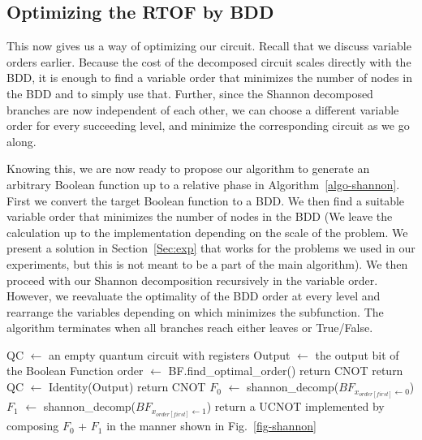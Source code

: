 \subsection{Optimizing the RTOF by BDD}
\label{Subsec:rtof-opt}
This now gives us a way of optimizing our circuit. Recall that we discuss variable orders earlier. Because the cost of the decomposed circuit scales directly with the BDD, it is enough to find a variable order that minimizes the number of nodes in the BDD and to simply use that. Further, since the Shannon decomposed branches are now independent of each other, we can choose a different variable order for every succeeding level, and minimize the corresponding circuit as we go along.

Knowing this, we are now ready to propose our algorithm to generate an arbitrary Boolean function up to a relative phase in Algorithm~\ref{algo-shannon}. First we convert the target Boolean function to a BDD. We then find a suitable variable order that minimizes the number of nodes in the BDD (We leave the calculation up to the implementation depending on the scale of the problem. We present a solution in Section~\ref{Sec:exp} that works for the problems we used in our experiments, but this is not meant to be a part of the main algorithm). We then proceed with our Shannon decomposition recursively in the variable order. However, we reevaluate the optimality of the BDD order at every level and rearrange the variables depending on which minimizes the subfunction. The algorithm terminates when all branches reach either leaves or True/False.
\begin{algorithm}[tb]
  \caption{shannon\_decomp(BF: a Boolean function)}
  \label{algo-shannon}
  \begin{algorithmic}
    \State QC $\leftarrow$ an empty quantum circuit with registers
    \State Output $\leftarrow$ the output bit of the Boolean Function
    \State order $\leftarrow$ BF.find\_optimal\_order()
    \State return CNOT
    \State return QC $\leftarrow$ Identity(Output)
    \State return CNOT
    \Else
    \State $F_0$ $\leftarrow$ shannon\_decomp($BF_{x_{order[first]}\leftarrow 0}$)
    \State $F_1$ $\leftarrow$ shannon\_decomp($BF_{x_{order[first]}\leftarrow 1}$)
    \State return a UCNOT implemented by composing $F_0$ + $F_1$ in the manner shown in Fig.~\ref{fig-shannon}
    \EndIf
  \end{algorithmic}
  
\end{algorithm}

